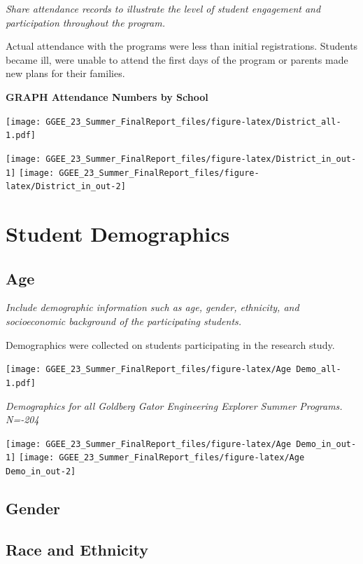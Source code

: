\documentclass[
]{article}
\begin{document}
\emph{Share attendance records to illustrate the level of student
engagement and participation throughout the program.}

Actual attendance with the programs were less than initial
registrations. Students became ill, were unable to attend the first days
of the program or parents made new plans for their families.

\textbf{GRAPH Attendance Numbers by School}

\texttt{[image: GGEE\_23\_Summer\_FinalReport\_files/figure-latex/District\_all-1.pdf]}

\texttt{[image: GGEE\_23\_Summer\_FinalReport\_files/figure-latex/District\_in\_out-1]}
\texttt{[image: GGEE\_23\_Summer\_FinalReport\_files/figure-latex/District\_in\_out-2]}

\hypertarget{student-demographics}{%
\section{Student Demographics}\label{student-demographics}}

\hypertarget{age}{%
\subsection{Age}\label{age}}

\emph{Include demographic information such as age, gender, ethnicity,
and socioeconomic background of the participating students.}

Demographics were collected on students participating in the research
study.

\texttt{[image: GGEE\_23\_Summer\_FinalReport\_files/figure-latex/Age Demo\_all-1.pdf]}

\emph{Demographics for all Goldberg Gator Engineering Explorer Summer
Programs. N=-204}

\texttt{[image: GGEE\_23\_Summer\_FinalReport\_files/figure-latex/Age Demo\_in\_out-1]}
\texttt{[image: GGEE\_23\_Summer\_FinalReport\_files/figure-latex/Age Demo\_in\_out-2]}

\hypertarget{gender}{%
\subsection{Gender}\label{gender}}

\hypertarget{race-and-ethnicity}{%
\subsection{Race and Ethnicity}\label{race-and-ethnicity}}
\end{document}
